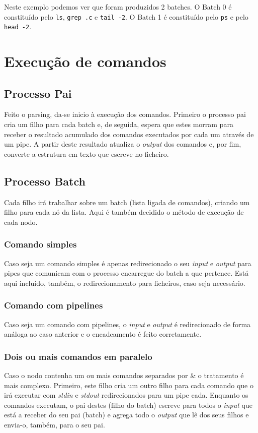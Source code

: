 \documentclass[12pt,a4paper]{report}
\begin{document}
        Neste exemplo podemos ver que foram produzidos 2 batches. O Batch 0 é
        constituído pelo \texttt{ls}, \texttt{grep .c} e
        \texttt{tail -2}. O Batch 1 é constituído pelo
        \texttt{ps} e pelo \texttt{head -2}.

\chapter{Execução de comandos}

    \section{Processo Pai}
        Feito o parsing, da-se inicio à execução dos comandos. Primeiro o
        processo pai cria um filho para cada batch e, de seguida, espera que
        estes morram para receber o resultado acumulado dos comandos
        executados por cada um através de um pipe. A partir deste resultado
        atualiza o \textit{output} dos comandos e, por fim, converte a estrutura
        em texto que escreve no ficheiro.

    \section{Processo Batch}
        Cada filho irá trabalhar sobre um batch (lista ligada de comandos),
        criando um filho para cada nó da lista. Aqui é também decidido o método
        de execução de cada nodo.
        \subsection{Comando simples}
            Caso seja um comando simples é apenas redirecionado o seu
            \textit{input} e \textit{output} para pipes que comunicam com o
            processo encarregue do batch a que pertence. Está aqui incluído,
            também, o redirecionamento para ficheiros, caso seja necessário.
        \subsection{Comando com pipelines}
            Caso seja um comando com pipelines, o \textit{input} e
            \textit{output} é redirecionado de forma análoga ao caso anterior e
            o encadeamento é feito corretamente.
        \subsection{Dois ou mais comandos em paralelo}
            Caso o nodo contenha um ou mais comandos separados por \& o
            tratamento é mais complexo. Primeiro, este filho cria um outro
            filho para cada comando que o irá executar com \textit{stdin}
            e \textit{stdout} redirecionados para um pipe cada. Enquanto os
            comandos executam, o pai destes (filho do batch) escreve para todos
            o \textit{input} que está a receber do seu pai (batch) e agrega todo
            o \textit{output} que lê dos seus filhos e envia-o, também, para o
            seu pai.
\clearpage
\end{document}
